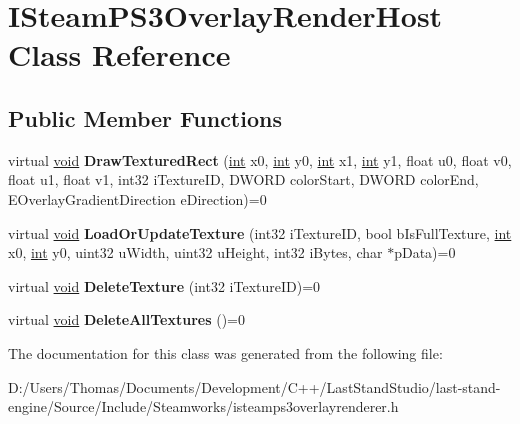 \hypertarget{classISteamPS3OverlayRenderHost}{}\section{I\+Steam\+P\+S3\+Overlay\+Render\+Host Class Reference}
\label{classISteamPS3OverlayRenderHost}
\subsection*{Public Member Functions}
\begin{DoxyCompactItemize}
\item 
\hypertarget{classISteamPS3OverlayRenderHost_aceea6859e6dc17d4777d46f402967004}{}virtual \hyperlink{SDL__audio_8h_a52835ae37c4bb905b903cbaf5d04b05f}{void} {\bfseries Draw\+Textured\+Rect} (\hyperlink{SDL__thread_8h_a6a64f9be4433e4de6e2f2f548cf3c08e}{int} x0, \hyperlink{SDL__thread_8h_a6a64f9be4433e4de6e2f2f548cf3c08e}{int} y0, \hyperlink{SDL__thread_8h_a6a64f9be4433e4de6e2f2f548cf3c08e}{int} x1, \hyperlink{SDL__thread_8h_a6a64f9be4433e4de6e2f2f548cf3c08e}{int} y1, float u0, float v0, float u1, float v1, int32 i\+Texture\+I\+D, D\+W\+O\+R\+D color\+Start, D\+W\+O\+R\+D color\+End, E\+Overlay\+Gradient\+Direction e\+Direction)=0\label{classISteamPS3OverlayRenderHost_aceea6859e6dc17d4777d46f402967004}

\item 
\hypertarget{classISteamPS3OverlayRenderHost_af53191a1a3cc8181569de10b8661c8eb}{}virtual \hyperlink{SDL__audio_8h_a52835ae37c4bb905b903cbaf5d04b05f}{void} {\bfseries Load\+Or\+Update\+Texture} (int32 i\+Texture\+I\+D, bool b\+Is\+Full\+Texture, \hyperlink{SDL__thread_8h_a6a64f9be4433e4de6e2f2f548cf3c08e}{int} x0, \hyperlink{SDL__thread_8h_a6a64f9be4433e4de6e2f2f548cf3c08e}{int} y0, uint32 u\+Width, uint32 u\+Height, int32 i\+Bytes, char $\ast$p\+Data)=0\label{classISteamPS3OverlayRenderHost_af53191a1a3cc8181569de10b8661c8eb}

\item 
\hypertarget{classISteamPS3OverlayRenderHost_af2888b63f4914f8fcd21c83a00a14b49}{}virtual \hyperlink{SDL__audio_8h_a52835ae37c4bb905b903cbaf5d04b05f}{void} {\bfseries Delete\+Texture} (int32 i\+Texture\+I\+D)=0\label{classISteamPS3OverlayRenderHost_af2888b63f4914f8fcd21c83a00a14b49}

\item 
\hypertarget{classISteamPS3OverlayRenderHost_a857354eca757374a2dd5bca550d432ab}{}virtual \hyperlink{SDL__audio_8h_a52835ae37c4bb905b903cbaf5d04b05f}{void} {\bfseries Delete\+All\+Textures} ()=0\label{classISteamPS3OverlayRenderHost_a857354eca757374a2dd5bca550d432ab}

\end{DoxyCompactItemize}


The documentation for this class was generated from the following file\+:\begin{DoxyCompactItemize}
\item 
D\+:/\+Users/\+Thomas/\+Documents/\+Development/\+C++/\+Last\+Stand\+Studio/last-\/stand-\/engine/\+Source/\+Include/\+Steamworks/isteamps3overlayrenderer.\+h\end{DoxyCompactItemize}
